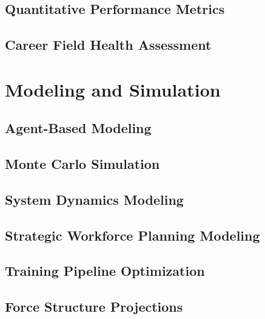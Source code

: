\documentclass[12pt,a4paper]{article}
\begin{document}
\subsection{Quantitative Performance Metrics}


\subsection{Career Field Health Assessment}


\newpage
\section{Modeling and Simulation}


\subsection{Agent-Based Modeling}


\subsection{Monte Carlo Simulation}


\subsection{System Dynamics Modeling}


\subsection{Strategic Workforce Planning Modeling}


\subsection{Training Pipeline Optimization}


\subsection{Force Structure Projections}

\end{document}

